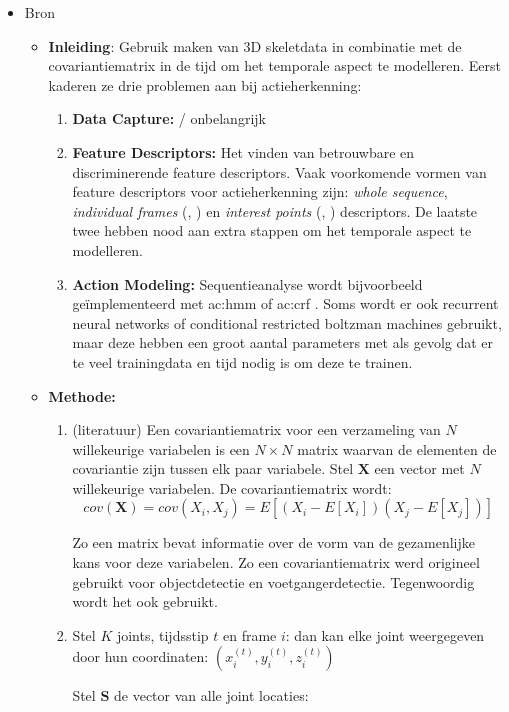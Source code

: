 \begin{itemize}
	\item Bron \cite{Hussein2011}
	\begin{itemize}
		\item \textbf{Inleiding}: Gebruik maken van  3D skeletdata in combinatie met de covariantiematrix in de tijd om het temporale aspect te modelleren. Eerst kaderen ze drie problemen aan bij actieherkenning:
		\begin{enumerate}
			\item \textbf{Data Capture:} / onbelangrijk
			\item \textbf{Feature Descriptors:} Het vinden van betrouwbare en discriminerende feature descriptors. Vaak voorkomende vormen van feature descriptors voor actieherkenning zijn: \textit{whole sequence}, \textit{individual frames} (\cite{Wang2012b}, \cite{Xia2012}) en \textit{interest points} (\cite{Laptev2003}, \cite{Gowayyed2013}) descriptors. De laatste twee hebben nood aan extra stappen om het temporale aspect te modelleren.
			\item \textbf{Action Modeling:} Sequentieanalyse wordt bijvoorbeeld geïmplementeerd met \gls{ac:hmm} \cite{Xia2012} of \gls{ac:crf} \cite{Han2010}. Soms wordt er ook recurrent neural networks \cite{Martens2011} of conditional restricted boltzman machines \cite{Mnih2012} gebruikt, maar deze hebben een groot aantal parameters met als gevolg dat er te veel trainingdata en tijd nodig is om deze te trainen.
		\end{enumerate}
		\item \textbf{Methode:}
		\begin{enumerate}
			\item (literatuur) Een covariantiematrix voor een verzameling van $N$ willekeurige variabelen is een $N\times N$ matrix waarvan de elementen de covariantie zijn tussen elk paar variabele. Stel $\textbf{X}$ een vector met $N$ willekeurige variabelen. De covariantiematrix wordt:
			$$cov(\textbf{X}) = cov(X_i, X_j) = E[(X_i - E[X_i])(X_j - E[X_j])]$$
			
			Zo een matrix bevat informatie over de vorm van de gezamenlijke kans voor deze variabelen.
			 Zo een covariantiematrix werd origineel gebruikt voor objectdetectie en voetgangerdetectie. Tegenwoordig wordt het ook gebruikt.
			\item Stel $K$ joints, tijdsstip $t$ en frame $i$: dan kan elke joint weergegeven door hun coordinaten: $(x_i^{(t)}, y_i^{(t)}, z_i^{(t)})$
			
			Stel $\textbf{S}$ de vector van alle joint locaties:
			

\end{enumerate}
\end{itemize}
\end{itemize}
